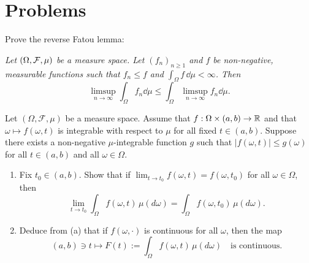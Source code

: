 %
%	


\section{Problems}

\begin{problem}\label{prb:reverse_fatou}
Prove the reverse Fatou lemma:

\smallskip
\textit{
Let $(\Omega, \mathcal F, \mu)$ be a measure space. Let $(f_n)_{n \ge 1}$ and $f$ be non-negative, measurable functions such that $f_n \le f$ and $\int_\Omega f \, \dd \mu <\infty$. Then
\[
	\limsup_{n\to \infty} \int_\Omega f_n \dd \mu \le \int_\Omega \limsup_{n\to \infty} f_n \dd \mu.
\]
}
\end{problem}

\begin{problem}\label{pb:DCT-parametric-function}
	Let $(\Omega,\mathcal{F},\mu)$ be a measure space. Assume that $f:\Omega\times(a,b)\to\mathbb R$ and that $\omega\mapsto f(\omega,t)$ is integrable with respect to $\mu$ for all fixed $t\in(a,b)$. Suppose there exists a non-negative $\mu$-integrable function $g$ such that $|f(\omega,t)|\le g(\omega)$ for all $t\in(a,b)$ and all $\omega\in\Omega$. 
	\begin{enumerate}[label={(\alph*)}]
		\item Fix $t_0\in(a,b)$. Show that if $\lim_{t\to t_0} f(\omega,t)=f(\omega,t_0)$ for all $\omega\in\Omega$, then
		\[
			\lim_{t\to t_0}\int_\Omega f(\omega,t)\,\mu(d\omega) = \int_\Omega f(\omega,t_0)\,\mu(d\omega).
		\]
		\item Deduce from (a) that if $f(\omega,\cdot)$ is continuous for all $\omega$, then the map
		\[
			(a,b)\ni t\mapsto F(t):=\int_\Omega f(\omega,t)\,\mu(d\omega)\quad\text{is continuous.}
		\]
	\end{enumerate}
\end{problem}

